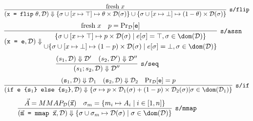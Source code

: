 \begin{figure}
\begin{mdframed}
  {\footnotesize
  \begin{align*}
    \infer[\texttt{s/flip}]
    {
      (\texttt{x = flip} \ \theta, \mathcal{D}) \Downarrow
      \{\sigma \cup [x \mapsto \top] \mapsto \theta \times \mathcal{D}(\sigma)\} \cup
      \{\sigma \cup [x \mapsto \bot] \mapsto (1 - \theta) \times \mathcal{D}(\sigma)\}
    }
    {
      \mathrm{fresh} \; x
    }
  \end{align*}
  \begin{align*}
    \infer[\texttt{s/assn}]
    {
      (\texttt{x = e}, \mathcal{D}) \Downarrow
      \begin{gathered}
      \{\sigma \cup [x \mapsto \top] \mapsto p \times\mathcal{D}(\sigma) \mid e[\sigma] = \top, \sigma \in \dom(\mathcal{D})\}
      \\
      \cup
      \{\sigma \cup [x \mapsto \bot] \mapsto (1-p) \times \mathcal{D}(\sigma) \mid e[\sigma] = \bot, \sigma \in \dom(\mathcal{D})\}
      \end{gathered}
    }
    {
      \mathrm{fresh} \; x
      &
      p = \Pr_{\mathcal D}[\texttt e]
    }
  \end{align*}
  \begin{align*}
    \infer[\texttt{s/seq}]
    {
        (s_1; s_2, \mathcal{D}) \Downarrow \mathcal{D}''
    }
    {
        (s_1, \mathcal{D}) \Downarrow \mathcal{D}'
        & (s_2, \mathcal{D}') \Downarrow \mathcal{D}''
    }
  \end{align*}
  \begin{align*}
    \infer[\texttt{s/if}]
    {
      (\texttt{if e \{s$_1$\} else \{s$_2$\}}, \mathcal{D}) \Downarrow
      \{\sigma \mapsto p \times \mathcal{D}_1(\sigma) +
      (1-p) \times \mathcal{D}_2(\sigma)| \sigma \in \dom(\mathcal{D}_1)\}
    }
    {
      (\texttt s_1, \mathcal{D}) \Downarrow \mathcal{D}_1
      & (\texttt s_2, \mathcal{D}) \Downarrow \mathcal{D}_2
      & \Pr_{\mathcal D}[\texttt e] = p
    }
  \end{align*}
  \begin{align*}
    \infer[\texttt{s/mmap}]
    {
      (\vec{\texttt{m}}\texttt{ = mmap }\vec{\texttt{x}}, \mathcal{D}) \Downarrow
      \{\sigma \cup \sigma_m \mapsto \mathcal{D}(\sigma) \mid \sigma \in \dom(\mathcal{D}) \}
    }
    {
      \vec{A} = MMAP_{\mathcal D}(\vec{\texttt{x}})
      & \sigma_m = \{m_i \mapsto A_i \mid i \in [1,n]\}
    }
  \end{align*}
  \begin{align*}

\end{align*}}
\end{mdframed}
\end{figure}
